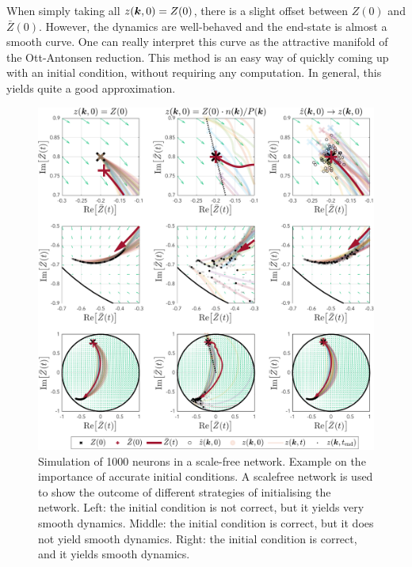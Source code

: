 
 
When simply taking all $z({\boldsymbol{k}}, 0) = Z(0)$, there is a slight offset between $Z(0)$ and $\bar{Z}(0)$. However, the dynamics are well-behaved and the end-state is almost a smooth curve. One can really interpret this curve as the attractive manifold of the Ott-Antonsen reduction. This method is an easy way of quickly coming up with an initial condition, without requiring any computation. In general, this yields quite a good approximation. \\

\begin{figure}[H]
\centering
\includegraphics[width = \textwidth]{../Figures/PhaseSpace/Mappings.pdf}
   \caption{Simulation of 1000 neurons in a scale-free network. Example on the importance of accurate initial conditions. A scalefree network is used to show the outcome of different strategies of initialising the network. Left: the initial condition is not correct, but it yields very smooth dynamics. Middle: the initial condition is correct, but it does not yield smooth dynamics. Right: the initial condition is correct, and it yields smooth dynamics.}
   \label{fig:mappings}
\end{figure}


